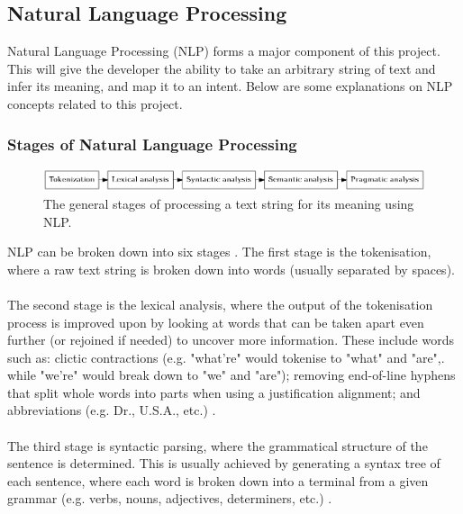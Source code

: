 \documentclass[11pt]{article}
\begin{document}
\subsection{Natural Language Processing}

Natural Language Processing (NLP) forms a major component of this project. This will give the developer the ability to take an arbitrary string of text and infer its meaning, and map it to an intent. Below are some explanations on NLP concepts related to this project.

\subsubsection{Stages of Natural Language Processing}

\begin{center}
\begin{figure}[H]
  \includegraphics[width=\textwidth]{nlp-stages.png}
  \caption{The general stages of processing a text string for its meaning using NLP.}
\end{figure}
\end{center}

NLP can be broken down into six stages \cite{RefWorks:38}. The first stage is the tokenisation, where a raw text string is broken down into words (usually separated by spaces).
\\
\\
The second stage is the lexical analysis, where the output of the tokenisation process is improved upon by looking at words that can be taken apart even further (or rejoined if needed) to uncover more information. These include words such as: clictic contractions (e.g. "what're" would tokenise to "what" and "are",. while "we're" would break down to "we" and "are"); removing end-of-line hyphens that split whole words into parts when using a justification alignment; and abbreviations (e.g. Dr., U.S.A., etc.) \cite{RefWorks:39}.
\\
\\
The third stage is syntactic parsing, where the grammatical structure of the sentence is determined. This is usually achieved by generating a syntax tree of each sentence, where each word is broken down into a terminal from a given grammar (e.g. verbs, nouns, adjectives, determiners, etc.) \cite{RefWorks:40}.
\end{document}
